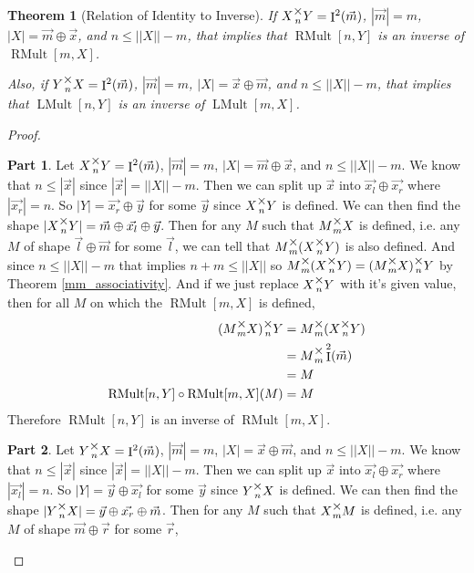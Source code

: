 \documentclass[12pt]{book}
\theoremstyle{plain}
\newtheorem{theorem}{Theorem}[chapter]
\theoremstyle{definition}
\theoremstyle{ppart}
\newtheorem{ppart}{Part}
\theoremstyle{case}
\theoremstyle{solution}
\DeclareMathOperator{\Ident}{I}
\DeclareMathOperator{\RMult}{RMult}
\DeclareMathOperator{\LMult}{LMult}
\newcommand{\mmult}[1]{\text{\raisebox{1ex}{$\underset{#1}{\times}$}}}
\begin{document}
\begin{theorem}[Relation of Identity to Inverse]
If $X \mmult{n} Y = \Ident^2(\vec{m})$, $|\vec{m}| = m$, $|X| = \vec{m} \oplus \vec{x}$,
and $n \le ||X||-m$, that implies that $\RMult[n, Y]$ is an inverse of $\RMult[m, X]$.

Also,  if $Y \mmult{n} X = \Ident^2(\vec{m})$, $|\vec{m}| = m$, $|X| = \vec{x} \oplus \vec{m}$,
and $n \le ||X||-m$, that implies that $\LMult[n, Y]$ is an inverse of $\LMult[m, X]$.
\end{theorem}
\begin{proof}
\begin{ppart}
Let $X \mmult{n} Y = \Ident^2(\vec{m})$, $|\vec{m}| = m$, $|X| = \vec{m} \oplus \vec{x}$, and $n \le ||X||-m$.
We know that $n \le |\vec{x}|$ since $|\vec{x}| = ||X||-m$.
Then we can split up $\vec{x}$ into $\vec{x_l} \oplus \vec{x_r}$ where $|\vec{x_r}| = n$.
So $|Y| = \vec{x_r} \oplus \vec{y}$ for some $\vec{y}$ since $X \mmult{n} Y$ is defined.
We can then find the shape $|X \mmult{n} Y| = \vec{m} \oplus \vec{x_l} \oplus \vec{y}$.
Then for any $M$ such that $M \mmult{m} X$ is defined, i.e. any $M$ of shape $\vec{l} \oplus \vec{m}$ for some $\vec{l}$,
we can tell that $M \mmult{m} (X \mmult{n} Y)$ is also defined.
And since $n \le ||X||-m$ that implies $n+m \le ||X||$ so $M \mmult{m} (X \mmult{n} Y) = (M \mmult{m} X) \mmult{n} Y$
by Theorem \ref{mm_associativity}.
And if we just replace $X \mmult{n} Y$ with it's given value, then for all $M$ on which the $\RMult[m,X]$ is defined,
\begin{align*}
  (M \mmult{m} X) \mmult{n} Y &= M \mmult{m} (X \mmult{n} Y)  \\
  &= M \mmult{m} \Ident^2(\vec{m}) \\
  &= M \\
  \RMult[n,Y] \circ \RMult[m,X](M) &= M
\end{align*}
Therefore $\RMult[n,Y]$ is an inverse of $\RMult[m,X]$.
\end{ppart}
\begin{ppart}
Let $Y \mmult{n} X = \Ident^2(\vec{m})$, $|\vec{m}| = m$, $|X| = \vec{x} \oplus \vec{m}$, and $n \le ||X||-m$.
We know that $n \le |\vec{x}|$ since $|\vec{x}| = ||X||-m$.
Then we can split up $\vec{x}$ into $\vec{x_l} \oplus \vec{x_r}$ where $|\vec{x_l}| = n$.
So $|Y| = \vec{y} \oplus \vec{x_l}$ for some $\vec{y}$ since $Y \mmult{n} X$ is defined.
We can then find the shape $|Y \mmult{n} X| = \vec{y} \oplus \vec{x_r} \oplus \vec{m}$.
Then for any $M$ such that $X \mmult{m} M$ is defined, i.e. any $M$ of shape $\vec{m} \oplus \vec{r}$ for some $\vec{r}$,

\end{ppart}
\end{proof}
\end{document}
